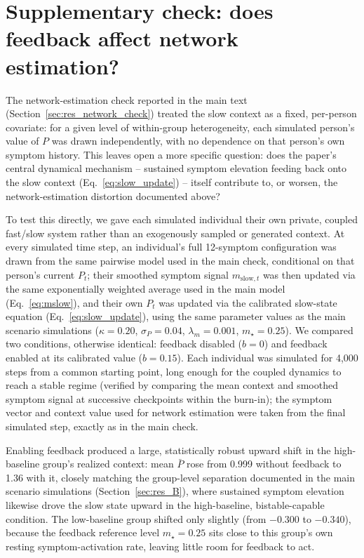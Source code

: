 
\section{Supplementary check: does feedback affect network estimation?}\label{app:network_feedback_check}

The network-estimation check reported in the main text (Section~\ref{sec:res_network_check}) treated the slow context as a fixed, per-person covariate: for a given level of within-group heterogeneity, each simulated person's value of $P$ was drawn independently, with no dependence on that person's own symptom history. This leaves open a more specific question: does the paper's central dynamical mechanism -- sustained symptom elevation feeding back onto the slow context (Eq.~\eqref{eq:slow_update}) -- itself contribute to, or worsen, the network-estimation distortion documented above?

To test this directly, we gave each simulated individual their own private, coupled fast/slow system rather than an exogenously sampled or generated context. At every simulated time step, an individual's full 12-symptom configuration was drawn from the same pairwise model used in the main check, conditional on that person's current $P_t$; their smoothed symptom signal $m_{\text{slow},t}$ was then updated via the same exponentially weighted average used in the main model (Eq.~\eqref{eq:mslow}), and their own $P_t$ was updated via the calibrated slow-state equation (Eq.~\eqref{eq:slow_update}), using the same parameter values as the main scenario simulations ($\kappa=0.20$, $\sigma_P=0.04$, $\lambda_m=0.001$, $m_\star=0.25$). We compared two conditions, otherwise identical: feedback disabled ($b=0$) and feedback enabled at its calibrated value ($b=0.15$). Each individual was simulated for 4{,}000 steps from a common starting point, long enough for the coupled dynamics to reach a stable regime (verified by comparing the mean context and smoothed symptom signal at successive checkpoints within the burn-in); the symptom vector and context value used for network estimation were taken from the final simulated step, exactly as in the main check.

Enabling feedback produced a large, statistically robust upward shift in the high-baseline group's realized context: mean $\bar P$ rose from 0.999 without feedback to 1.36 with it, closely matching the group-level separation documented in the main scenario simulations (Section~\ref{sec:res_B}), where sustained symptom elevation likewise drove the slow state upward in the high-baseline, bistable-capable condition. The low-baseline group shifted only slightly (from $-0.300$ to $-0.340$), because the feedback reference level $m_\star = 0.25$ sits close to this group's own resting symptom-activation rate, leaving little room for feedback to act.


